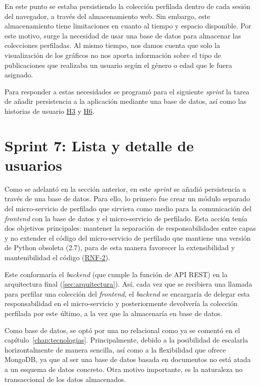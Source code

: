 En este punto se estaba persistiendo la colección perfilada dentro de cada sesión del navegador, a través del almacenamiento web. Sin embargo, este almacenamiento tiene limitaciones en cuanto al tiempo y espacio disponible. Por este motivo, surge la necesidad de usar una base de datos para almacenar las colecciones perfiladas. Al mismo tiempo, nos damos cuenta que solo la visualización de los gráficos no nos aporta información sobre el tipo de publicaciones que realizaba un usuario según el género o edad que le fuera asignado.

Para responder a estas necesidades se programó para el siguiente \textit{sprint} la tarea de añadir persistencia a la aplicación mediante una base de datos, así como las historias de usuario \hyperref[tab:user-stories]{H3} y \hyperref[tab:user-stories]{H6}.

\section{Sprint 7: Lista y detalle de usuarios}

Como se adelantó en la sección anterior, en este \textit{sprint} se añadió persistencia a través de una base de datos. Para ello, lo primero fue crear un módulo separado del micro-servicio de perfilado que sirviera como medio para la comunicación del \textit{frontend} con la base de datos y el micro-servicio de perfilado. Esta acción tenía dos objetivos principales: mantener la separación de responsabilidades entre capas y no extender el código del micro-servicio de perfilado que mantiene una versión de Python obsoleta (2.7), para de esta manera favorecer la extensibilidad y mantenibilidad el código (\hyperref[tab:rnf]{RNF-2}). 

Este conformaría el \textit{backend} (que cumple la función de API REST) en la arquitectura final (\ref{sec:arquitectura}). Así, cada vez que se recibiera una llamada para perfilar una colección del \textit{frontend}, el \textit{backend} se encargaría de delegar esta responsabilidad en el micro-servicio y posteriormente devolvería la colección perfilada por este último, a la vez que la almacenaría en base de datos.

Como base de datos, se optó por una no relacional como ya se comentó en el capítulo~\ref{chap:tecnologias}. Principalmente, debido a la posibilidad de escalarla horizontalmente de manera sencilla, así como a la flexibilidad que ofrece MongoDB, ya que al ser una base de datos basada en documentos no está atada a un esquema de datos concreto. Otra motivo importante, es la naturaleza no transaccional de los datos almacenados.


